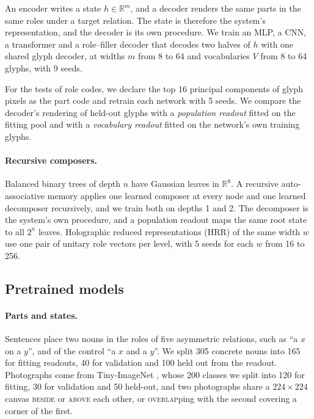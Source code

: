\documentclass[10pt]{article}
\theoremstyle{plain}
\theoremstyle{remark}
\newcommand{\R}{\mathbb{R}}
\begin{document}
An encoder writes a state $h \in \R^m$, and a decoder renders the same parts in the same roles under a target relation. The state is therefore the system's representation, and the decoder is its own procedure. We train an MLP, a CNN, a transformer and a role--filler decoder that decodes two halves of $h$ with one shared glyph decoder, at widths $m$ from 8 to 64 and vocabularies $V$ from 8 to 64 glyphs, with 9 seeds.

For the tests of role codes, we declare the top 16 principal components of glyph pixels as the part code and retrain each network with 5 seeds. We compare the decoder's rendering of held-out glyphs with a \emph{population readout} fitted on the fitting pool and with a \emph{vocabulary readout} fitted on the network's own training glyphs.

\paragraph{Recursive composers.} Balanced binary trees of depth $n$ have Gaussian leaves in $\R^8$. A recursive auto-associative memory \citep{pollack1990} applies one learned composer at every node and one learned decomposer recursively, and we train both on depths 1 and 2. The decomposer is the system's own procedure, and a population readout maps the same root state to all $2^n$ leaves. Holographic reduced representations (HRR) of the same width $w$ use one pair of unitary role vectors per level, with 5 seeds for each $w$ from 16 to 256.

\subsection{Pretrained models}
\label{sec:design_pretrained}

\paragraph{Parts and states.} Sentences place two nouns in the roles of five asymmetric relations, such as ``a $x$ on a $y$'', and of the control ``a $x$ and a $y$''. We split 305 concrete nouns into 165 for fitting readouts, 40 for validation and 100 held out from the readout. Photographs come from Tiny-ImageNet \citep{le2015tiny}, whose 200 classes we split into 120 for fitting, 30 for validation and 50 held-out, and two photographs share a $224 \times 224$ canvas \textsc{beside} or \textsc{above} each other, or \textsc{overlap}ping with the second covering a corner of the first.
\end{document}
